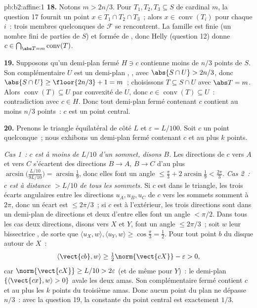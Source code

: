 \begin{solution}{pb:b2:affine:1}
\textbf{18.} Notons $m > 2n/3$. Pour $T_1, T_2, T_3 \subseteq S$
de cardinal $m$, la question 17 fournit un point $x \in T_1
\cap T_2 \cap T_3$~; alors $x \in \operatorname{conv}(T_i)$ pour
chaque $i$~: trois membres quelconques de $\mathcal F$ se rencontrent.
La famille est finie (un nombre fini de parties de $S$) et formée de
, donc Helly (question 12) donne $c \in
\bigcap_{\abs T = m}\operatorname{conv}(T)$.

\textbf{19.} Supposons qu'un demi-plan fermé $H \ni c$
contienne moins de $n/3$ points de $S$. Son complémentaire $U$
est un demi-plan , , avec $\abs{S \cap U} > 2n/3$,
donc $\abs{S \cap U} \geq \floor{2n/3} + 1 = m$~; choisissons $T
\subseteq S \cap U$ avec $\abs T = m$. Alors
$\operatorname{conv}(T) \subseteq U$ par convexité de $U$, donc
$c \in \operatorname{conv}(T) \subseteq U$~: contradiction
avec $c \in H$. Donc tout demi-plan fermé contenant $c$
contient au moins $n/3$ points~: $c$ est un point central.

\textbf{20.} Prenons le triangle équilatéral de côté $L$ et
$\varepsilon = L/100$. Soit $c$ un point quelconque~; nous exhibons un
demi-plan fermé contenant $c$ et au plus $k$ points.

\emph{Cas 1~: $c$ est à moins de $L/10$ d'un sommet, disons $B$.}
Les directions de $c$ vers $A$ et vers $C$ s'écartent des
directions $B \to A$, $B \to C$ d'au plus
$\arcsin\bigl(\tfrac{L/10}{9L/10}\bigr) = \arcsin\tfrac19$,
donc elles font un angle $\leq \tfrac\pi3 + 2\arcsin\tfrac19 <
\tfrac{2\pi}3$. \emph{Cas 2~: $c$ est à distance $> L/10$
de tous les sommets.} Si $c$ est dans le triangle, les trois
écarts angulaires entre les directions $u_A, u_B, u_C$ de $c$
vers les sommets somment à $2\pi$, donc un écart est $\leq 2\pi/3$~;
si $c$ est à l'extérieur, les trois directions sont dans un demi-plan
 de directions et deux d'entre elles font un angle $<
\pi/2$. Dans tous les cas deux directions, disons vers $X$ et $Y$,
font un angle $\leq 2\pi/3$~; soit $w$ leur bissectrice ,
de sorte que $\langle u_X, w\rangle, \langle u_Y, w\rangle \geq
\cos\tfrac\pi3 = \tfrac12$. Pour tout point $b$ du disque
autour de $X$~:
\[
\langle \vect{cb}, w\rangle \geq
\tfrac12\norm{\vect{cX}} - \varepsilon > 0,
\]
car $\norm{\vect{cX}} \geq L/10 > 2\varepsilon$ (et
de même pour $Y$)~: le demi-plan  $\{\langle \vect{cx},
w\rangle > 0\}$ avale les deux amas. Son complémentaire fermé
contient $c$ et au plus les $k$ points du troisième amas. Donc
aucun point du plan ne dépasse $n/3$~: avec la question 19, la
constante du point central est exactement $1/3$.


\end{solution}
